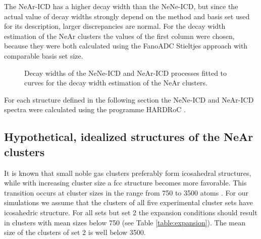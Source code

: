 The NeAr-ICD has a higher decay width than the NeNe-ICD, but since the
actual value of decay widths strongly depend on the method and basis set
used for its description, larger discrepancies are normal. For the decay
width estimation of the NeAr clusters the values of the first column were
chosen, because they were both calculated using the FanoADC Stieltjes approach
with comparable basis set size.

\begin{figure}[h]
 \centering
 
 \caption{Decay widths of the NeNe-ICD and NeAr-ICD processes fitted to
          curves for the decay width estimation of the NeAr clusters.}
 \label{figure:fitted_NeAr_widths}
\end{figure}

For each structure defined in the following section the NeNe-ICD and NeAr-ICD
spectra were calculated using the programme HARDRoC \cite{HARDRoC}.




\subsection{Hypothetical, idealized structures of the NeAr clusters}

It is known that small noble gas clusters preferably form icosahedral structures,
while with increasing cluster size a fcc structure becomes more favorable. This transition
occurs at cluster sizes in the range from 750 to 3500 atoms \cite{Martin96,Doye97,Hartke02}.
For our simulations we assume that the clusters of all five experimental cluster sets have 
icosahedric structure. For all sets but set 2 the expansion conditions should result in clusters 
with mean sizes below 750 (see Table \ref{table:expansion}). The mean size of the clusters of set 2 is well below 3500.

